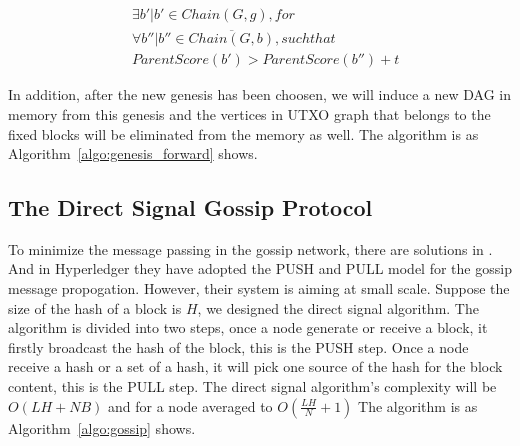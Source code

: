 \begin{equation}
    \begin{flalign*}
        & \exists b' | b' \in Chain(G, g), for \\ 
        & \forall b'' | b'' \in \overline{Chain(G,b)}, such that \\
        & ParentScore(b') > ParentScore(b'') + t 
    \end{flalign*}
\end{equation}

In addition, after the new genesis has been choosen, 
we will induce a new DAG in memory from this genesis 
and the vertices in UTXO graph that belongs to the fixed blocks will be eliminated from the memory as well.  
The algorithm is as Algorithm~\ref{algo:genesis_forward} shows.




\subsection{The Direct Signal Gossip Protocol}
To minimize the message passing in the gossip network,
there are solutions in \cite{demers1988epidemic}. And in Hyperledger \cite{androulaki2018hyperledger}
they have adopted the PUSH and PULL model for the gossip message propogation. However, their system is aiming at small scale.
Suppose the size of the hash of a block is $H$, we designed the direct signal algorithm.
The algorithm is divided into two steps, once a node generate or receive a block,
it firstly broadcast the hash of the block, this is the PUSH step.
Once a node receive a hash or a set of a hash,
it will pick one source of the hash for the block content, this is the PULL step.
The direct signal algorithm's complexity will be $O(LH + NB)$ and for a node averaged to $O(\frac{LH}{N} + 1)$
The algorithm is as Algorithm~\ref{algo:gossip} shows.


